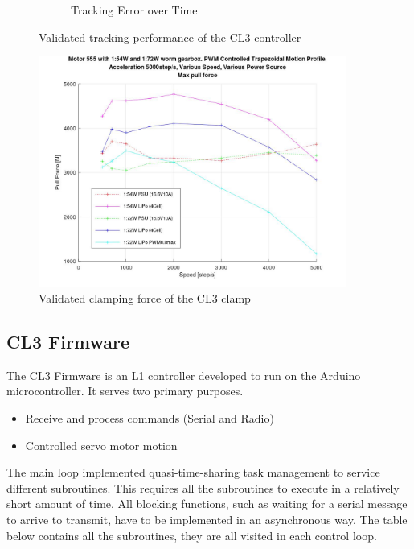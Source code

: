 \begin{figure}[!htp]
\begin{subfigure}[b]{0.49\textwidth}
        \caption{Tracking Error over Time}
        \label{fig:cl3-validation-error}
    \end{subfigure}
    \caption{Validated tracking performance of the CL3 controller}
    \label{fig:cl3-validation-motion-profile}
\end{figure}

\begin{figure}[!htp]
    \centering
    \includegraphics[width=0.90\textwidth]{images/05/image52.jpg}
    \caption{Validated clamping force of the CL3 clamp}
    \label{fig:cl3-validation-clamping-force}
\end{figure}

\FloatBarrier

\subsection{CL3 Firmware}
\label{subsection:exploration-2-cl3-firmware}

The CL3 Firmware is an L1 controller developed to run on the Arduino microcontroller. It serves two primary purposes.

\begin{itemize}[nosep]
    \item Receive and process commands (Serial and Radio)
    \item Controlled servo motor motion
\end{itemize}

The main loop implemented quasi-time-sharing task management to service different subroutines. This requires all the subroutines to execute in a relatively short amount of time. All blocking functions, such as waiting for a serial message to arrive to transmit, have to be implemented in an asynchronous way. The table below contains all the subroutines, they are all visited in each control loop.

